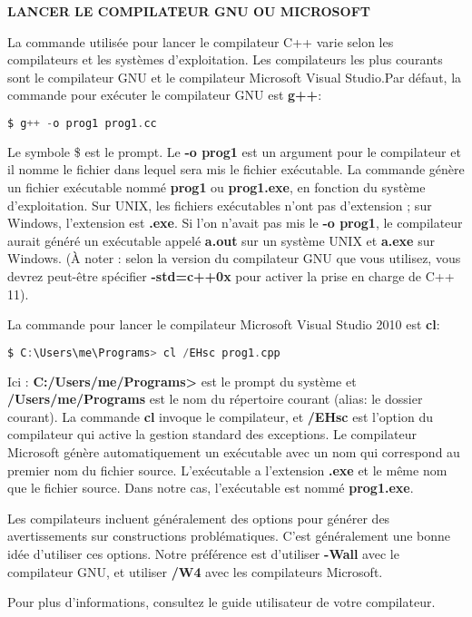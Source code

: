 \begin{shadebox}
	\textbf{LANCER LE COMPILATEUR GNU OU MICROSOFT}
	
	La commande utilisée pour lancer le compilateur C++ varie selon les compilateurs et les systèmes d'exploitation. Les compilateurs les plus courants sont le compilateur GNU et le compilateur Microsoft Visual Studio.Par défaut, la commande pour exécuter le compilateur GNU est \textbf{g++}:
	
	\medbreak
	\begin{lstlisting}[language=C]
		$ g++ -o prog1 prog1.cc
	\end{lstlisting}
	\medbreak
	
	Le symbole \$ est le prompt. Le \textbf{-o prog1} est un argument pour le compilateur et il nomme le fichier dans lequel sera mis le fichier exécutable. La commande génère un fichier exécutable nommé \textbf{prog1} ou \textbf{prog1.exe}, en fonction du système d'exploitation. Sur UNIX, les fichiers exécutables n'ont pas d'extension ; sur Windows, l'extension est \textbf{.exe}. Si l'on n'avait pas mis le \textbf{-o prog1}, le compilateur aurait généré un exécutable appelé \textbf{a.out} sur un système UNIX et \textbf{a.exe} sur Windows. (À noter : selon la version du compilateur GNU que vous utilisez, vous devrez peut-être spécifier \textbf{-std=c++0x} pour activer la prise en charge de C++ 11).   
	
	La commande pour lancer le compilateur Microsoft Visual Studio 2010 est \textbf{cl}:
	
	\medbreak
	\begin{lstlisting}[language=C]
		$ C:\Users\me\Programs> cl /EHsc prog1.cpp
	\end{lstlisting}
	\medbreak
	
	Ici : \textbf{C:/Users/me/Programs>} est le prompt du système et \textbf{/Users/me/Programs} est le nom du répertoire courant (alias: le dossier courant). La commande \textbf{cl} invoque le compilateur, et \textbf{/EHsc} est l'option du compilateur qui active la gestion standard des exceptions. Le compilateur Microsoft génère automatiquement un exécutable avec un nom qui correspond au premier nom du fichier source. L'exécutable a l'extension \textbf{.exe} et le même nom que le fichier source. Dans notre cas, l'exécutable est nommé \textbf{prog1.exe}.
	
	Les compilateurs incluent généralement des options pour générer des avertissements sur constructions problématiques. C'est généralement une bonne idée d'utiliser ces options. Notre préférence est d'utiliser \textbf{-Wall} avec le compilateur GNU, et utiliser \textbf{/W4} avec les compilateurs Microsoft.
	
	Pour plus d'informations, consultez le guide utilisateur de votre compilateur.
	
\end{shadebox} 

